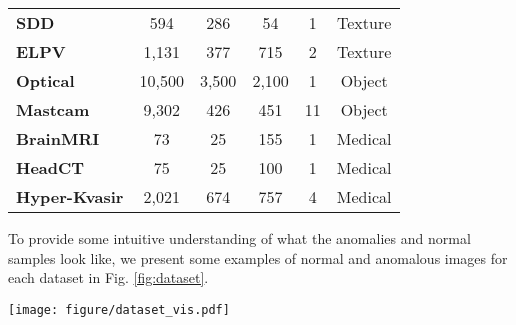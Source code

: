\documentclass[10pt,twocolumn,letterpaper]{article}
\begin{document}
\begin{table}[t]
{\begin{tabular}{l@{}|ccc|cc}
    \textbf{SDD }  & 594   & 286   & 54    & 1 & Texture \\
    \textbf{ELPV}  & 1,131  & 377   & 715   & 2 & Texture \\
    \textbf{Optical} & 10,500 & 3,500  & 2,100  & 1& Object  \\
    \textbf{Mastcam}& 9,302  & 426   & 451   & 11 & Object \\
    \textbf{BrainMRI} & 73    & 25    & 155   & 1 & Medical \\
   \textbf{HeadCT} & 75    & 25    & 100   & 1 & Medical \\
    \textbf{Hyper-Kvasir} & 2,021  & 674   & 757   & 4& Medical \\
    \hline
    \end{tabular}}
  \label{tab:stat}\end{table}\begin{table}[t]
  \centering
  \caption{Download Link of Image Datasets. }
  \label{tab:link}\end{table}


To provide some intuitive understanding of what the anomalies and normal samples look like, we present some examples of normal and anomalous images for each dataset in Fig. \ref{fig:dataset}.

\begin{figure*}[h!]
  \centering
    \texttt{[image: figure/dataset\_vis.pdf]}
  \caption{Examples of normal and anomalous images for each dataset. For each group of examples, the images on the top are normal, while the bottom ones are anomalous.}
  \label{fig:dataset}
\end{figure*}
\end{document}
